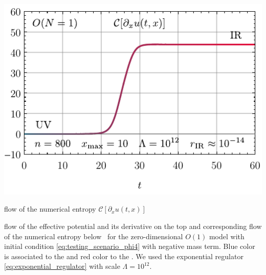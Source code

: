 	{
		\includegraphics[width=\subcaptionFigureWidth]{0d/figures/sc_ii_n_on=1_n=800_xmax=10_lambda=1.0e12_tir=60_entropy_flow.pdf}
		\caption{\frg{} flow of the numerical entropy $\mathcal{C} [ \partial_x u ( t, x ) ]$}%
		\label{fig:sc_ii_n_on=1_n=800_xmax=10_lambda=1.0e12_tir=60_entropy_flow}%
	} %
	{%
		\caption{
			\frg{} flow of the effective potential and its derivative on the top  and corresponding flow of the numerical entropy below~ for the zero-dimensional $O(1)$ model with initial condition \eqref{eq:testing_scenario_phi4} with negative mass term.
			{Blue} color is associated to the \uv{} and {red} color to the \ir{}.
			We used the exponential regulator \cref{eq:exponential_regulator} with \uv{} scale $\Lambda = 10^{12}$.
		}\label{fig:sc_ii_n_on=1_n=800_xmax=10_lambda=1.0e12_tir=60}
	}
	{\fullWidthTwoColumnFigureSpacing}
